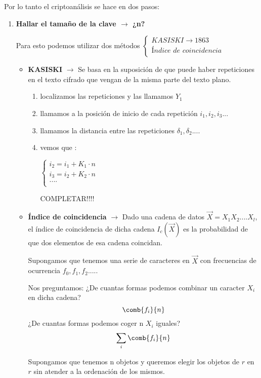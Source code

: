 Por lo tanto el criptoanálisis se hace en dos pasos:
\begin{enumerate}
	\item\textbf{ Hallar el tamaño de la clave $\rightarrow$ ¿n?}
	
	Para esto podemos utilizar dos métodos $\begin{cases}
	KASISKI \rightarrow 1863\\
	\textit{Índice de coincidencia}\\
	\end{cases}$
	\begin{itemize}
		\item \textbf{KASISKI} $\rightarrow$ Se basa en la suposición de que puede haber repeticiones en el texto cifrado que vengan de la misma parte del texto plano.
		
		\begin{enumerate}
			\item localizamos las repeticiones y las llamamos $Y_1$
			\item llamamos a la posición de inicio de cada repetición $i_1, i_2,i_3...$
			\item llamamos la distancia entre las repeticiones $\delta_1 , \delta_2....$
			\item vemos que :
			
			$\begin{cases}
			i_2 = i_1 + K_1\cdot n\\
			i_3 = i_2 + K_2\cdot n\\
			....\\
			\end{cases}$ 
			
			COMPLETAR!!!!
		\end{enumerate}
		\item \textbf{Índice de coincidencia} $\rightarrow$ Dado una cadena de datos $\overrightarrow{X} = X_1 X_2 .... X_l$, el índice de coincidencia de dicha cadena $I_c(\overrightarrow{X})$ es la probabilidad de que dos elementos de esa cadena coincidan.
		
		Supongamos que tenemos una serie de caracteres en $\overrightarrow{X}$ con frecuencias de ocurrencia $f_0,f_1, f_2 ....$.
		
		Nos preguntamos: ¿De cuantas formas podemos combinar un caracter $X_i$ en dicha cadena?
		$$\comb{f_i}{n}$$
		¿De cuantas formas podemos coger n $X_i$ iguales?
		$$\sum_{i} \comb{f_i}{n}$$
		
		\begin{remark}
			Supongamos que tenemos n objetos y queremos elegir los objetos de $r$ en $r$ sin atender a la ordenación de los mismos.
			

\end{remark}
\end{itemize}
\end{enumerate}
